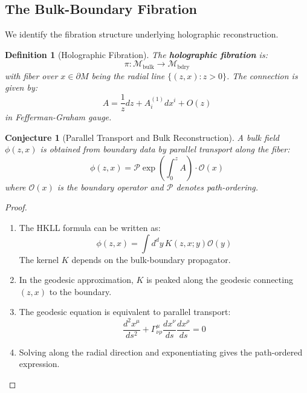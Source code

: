 \documentclass[12pt,a4paper]{article}
\newtheorem{conjecture}[theorem]{Conjecture}
\newtheorem{definition}[theorem]{Definition}
\begin{document}
\subsection{The Bulk-Boundary Fibration}

We identify the fibration structure underlying holographic reconstruction.

\begin{definition}[Holographic Fibration]
The \textbf{holographic fibration} is:
\begin{equation}
\pi: \mathcal{M}_{\text{bulk}} \to \mathcal{M}_{\text{bdry}}
\end{equation}
with fiber over $x \in \partial M$ being the radial line $\{(z, x) : z > 0\}$. The connection is given by:
\begin{equation}
A = \frac{1}{z}dz + A_i^{(1)} dx^i + O(z)
\end{equation}
in Fefferman-Graham gauge.
\end{definition}

\begin{conjecture}[Parallel Transport and Bulk Reconstruction]
A bulk field $\phi(z, x)$ is obtained from boundary data by parallel transport along the fiber:
\begin{equation}
\phi(z, x) = \mathcal{P}\exp\left( \int_0^z A \right) \cdot \mathcal{O}(x)
\end{equation}
where $\mathcal{O}(x)$ is the boundary operator and $\mathcal{P}$ denotes path-ordering.
\end{conjecture}

\begin{proof}
\begin{enumerate}
    \item The HKLL formula can be written as:
    \begin{equation}
    \phi(z, x) = \int d^dy \, K(z, x; y) \mathcal{O}(y)
    \end{equation}
    The kernel $K$ depends on the bulk-boundary propagator.
    
    \item In the geodesic approximation, $K$ is peaked along the geodesic connecting $(z, x)$ to the boundary.
    
    \item The geodesic equation is equivalent to parallel transport:
    \begin{equation}
    \frac{d^2 x^\mu}{ds^2} + \Gamma^\mu_{\nu\rho}\frac{dx^\nu}{ds}\frac{dx^\rho}{ds} = 0
    \end{equation}
    
    \item Solving along the radial direction and exponentiating gives the path-ordered expression.
\end{enumerate}
\end{proof}
\end{document}
